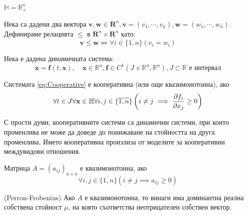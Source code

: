 \begin{definition}
  $\mathbb{H} = \mathbb{R}_{+}^n$
\end{definition}

\begin{definition}
  Нека са дадени два вектора $\mathbf{v}, \mathbf{w} \in \mathbf{R}^n, \mathbf{v}=(v_1, \cdots, v_n), \mathbf{w}=(w_1, \cdots, w_n)$. Дефинираме релацията $\leq$ в $\mathbf{R}^n \times \mathbf{R}^n$ като:
  \begin{equation*}
    \mathbf{v} \leq \mathbf{w} \iff \forall{i \in \{\overline{1,n}\}}(v_i = w_i)
  \end{equation*}
\end{definition}

Нека е дадена динамичната система:
\begin{equation}
  \label{eq:Cooperative}
  \dot{\mathbf{x}} = \mathbf{f}(t, \mathbf{x}),  \quad \mathbf{x} \in \mathbb{R}^n, \mathbf{f} \in C^1(J \times \mathbb{R}^n, \mathbb{R}^n), J \subset \mathbb{R} \text{ е интервал}
\end{equation}

\begin{definition}
  \label{def:Cooperative}
  Системата \ref{eq:Cooperative} е кооперативна (или още квазимонотонна), ако
  \begin{equation}
    \forall{t \in J}\forall{\mathbf{x} \in \mathbb{H}}\forall{i,j \in \{\overline{1,n}\}}\left(i \neq j \implies \pdv{f_i}{x_j}(t, \mathbf{x}) \geq 0\right)
  \end{equation}
\end{definition}
С прости думи, кооперативните системи са динамични системи, при които променлива не може да доведе до понижаване на стойността на друга променлива. Името кооперативна произлиза от моделите за кооперативни междувидови отношения.

\begin{definition}
  Матрица $A=(a_{ij})_{n \times n}$ е квазимонотонна, ако
  \begin{equation*}
    \forall{i,j \in \{\overline{1,n}\}} \left(i \neq j \implies a_{ij} \geq 0\right)
  \end{equation*}
\end{definition}

\begin{theorem}(Perron-Frobenius)
  Ако $A$ е квазимонотонна, то винаги има доминантна реална собствена стойност $\mu$, на която съответства неотрицателен собствен вектор.
\end{theorem}

